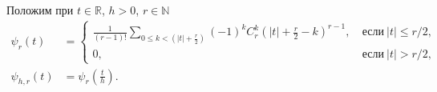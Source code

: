 


Положим при $t\in\mathbb{R}$, $h>0$, $r\in\mathbb{N}$
\begin{align*}
  \psi_r(t)&=
  \begin{cases}
    \frac{1}{(r-1)!}\sum\limits_{0\leqslant k<\left(|t|+\frac{r}{2}\right)}(-1)^kC_r^k\left(|t|+\frac{r}{2}-k\right)^{r-1},
    &\ \text{если}\ |t|\leqslant r/2,\\
    0,&\ \text{если}\ |t| > r/2,
  \end{cases}\\
  \psi_{h,r}(t)&=\psi_r\left(\frac{t}{h}\right).
\end{align*}

